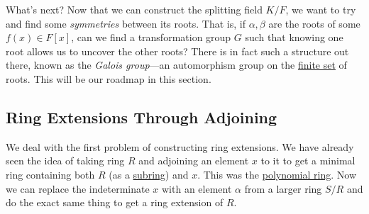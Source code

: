  What's next? Now that we can construct the splitting field $K/F$, we want to try and find some \textit{symmetries} between its roots. That is, if $\alpha, \beta$ are the roots of some $f(x) \in F[x]$, can we find a transformation group $G$ such that knowing one root allows us to uncover the other roots? There is in fact such a structure out there, known as the \textit{Galois group}---an automorphism group on the \hyperref[st-def:finite-set]{finite set} of roots. This will be our roadmap in this section. 

\subsection{Ring Extensions Through Adjoining} 

  We deal with the first problem of constructing ring extensions. We have already seen the idea of taking ring $R$ and adjoining an element $x$ to it to get a minimal ring containing both $R$ (as a \hyperref[def:subring]{subring}) and $x$. This was the \hyperref[def:polynomial-ring]{polynomial ring}. Now we can replace the indeterminate $x$ with an element $\alpha$ from a larger ring $S/R$ and do the exact same thing to get a ring extension of $R$. 

